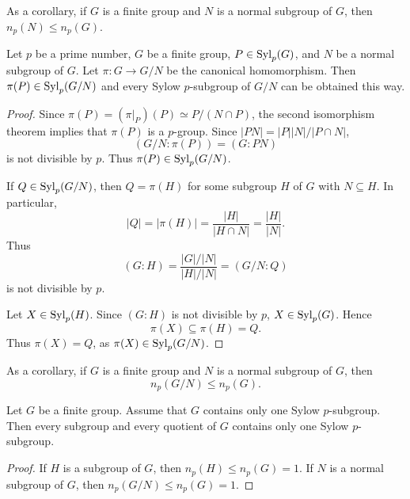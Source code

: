 As a corollary, if $G$ is a finite group and 
$N$ is a normal subgroup of $G$, then 
$n_p(N)\leq n_p(G)$.

\begin{optional}
\begin{theorem}
    Let $p$ be a prime number, $G$ be a finite group, $P\in\mathrm{Syl}_p(G)$, 
    and $N$ be a normal subgroup of $G$. Let $\pi\colon G\to G/N$ be the canonical homomorphism. Then 
    $\pi(P)\in\mathrm{Syl}_p(G/N)$ and every Sylow 
    $p$-subgroup of $G/N$ can be obtained this way. 
\end{theorem}

\begin{proof}
    Since $\pi(P)=(\pi|_{P})(P)\simeq P/(N\cap P)$,
    the second isomorphism theorem 
    implies that 
    $\pi(P)$ is a $p$-group. Since
    $|PN|=|P||N|/|P\cap N|$,
        \[
                (G/N:\pi(P))=(G:PN)
        \]
        is not divisible by $p$. Thus $\pi(P)\in\mathrm{Syl}_p(G/N)$.

        If $Q\in\mathrm{Syl}_p(G/N)$, then $Q=\pi(H)$ for some
        subgroup $H$ of $G$
        with $N\subseteq H$. In particular,
        \[
                |Q|=|\pi(H)|=\frac{|H|}{|H\cap N|}=\frac{|H|}{|N|}.
        \]
        Thus 
        \[
                (G:H)=\frac{|G|/|N|}{|H|/|N|}=(G/N:Q)
        \]
        is not divisible by $p$. 
        
        Let $X\in\mathrm{Syl}_p(H)$. Since $(G:H)$ is not divisible by $p$, 
        $X\in\mathrm{Syl}_p(G)$. Hence 
        \[
        \pi(X)\subseteq\pi(H)=Q. 
        \]
        Thus 
        $\pi(X)=Q$, as 
        $\pi(X)\in\mathrm{Syl}_p(G/N)$.
\end{proof}
\end{optional}

As a corollary, if $G$ is a finite group and
$N$ is a normal subgroup of $G$, then 
\[
n_p(G/N)\leq n_p(G).
\]

\begin{optional}
\begin{corollary}
Let $G$ be a finite group. Assume that 
$G$ contains only one Sylow $p$-subgroup. Then
every subgroup and every quotient of 
$G$ 
contains only one Sylow 
$p$-subgroup. 
\end{corollary}

\begin{proof}
    If $H$ is a subgroup of $G$, then
    $n_p(H)\leq n_p(G)=1$. If $N$ is a normal subgroup of 
    $G$, then $n_p(G/N)\leq n_p(G)=1$.
\end{proof}    
\end{optional}

